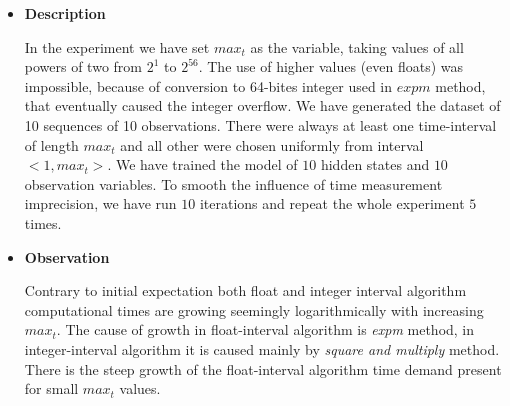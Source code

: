 \documentclass[thesis=M,english]{FITthesis}[2012/10/20]
\begin{document}
\begin{itemize}
\item \textbf{ Description }

In the experiment we have set $max_t$ as the variable, taking values of all powers of two from $2^1$ to $2^{56}$. The use of higher values (even floats) was impossible, because of conversion to 64-bites integer used in $expm$ method, that eventually caused the integer overflow. We have generated the dataset of 10 sequences of 10 observations. There were always at least one time-interval of length $max_t$ and all other were chosen uniformly from interval $<1,max_t>$. We have trained the model of $10$ hidden states and $10$ observation variables. To smooth the influence of time measurement imprecision, we have run $10$ iterations and repeat the whole experiment $5$ times.   

\item \textbf{ Observation }

Contrary to initial expectation both float and integer interval algorithm computational times are growing seemingly logarithmically with increasing $max_t$. The cause of growth in float-interval algorithm is \textit{expm} method, in integer-interval algorithm it is caused mainly by \textit{square and multiply} method. There is the steep growth of the float-interval algorithm time demand present for small $max_t$ values.


\end{itemize}
\end{document}

